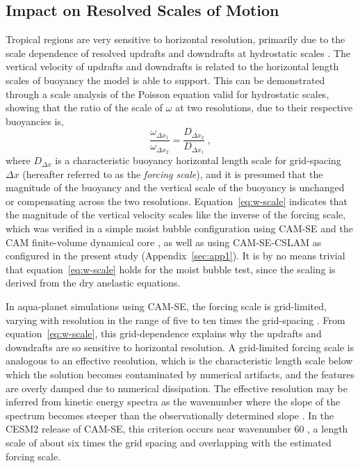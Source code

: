 \documentclass{agujournal}
\begin{document}
\subsection{Impact on Resolved Scales of Motion}\label{sec:aquaplanet}

Tropical regions are very sensitive to horizontal resolution, primarily due to the scale dependence of resolved updrafts and downdrafts at hydrostatic scales \citep{WETAL1997MWR,PG2006JAS,J2017JAMES,HR2017JCLIM,HR2018JAMES}. The vertical velocity of updrafts and downdrafts is related to the horizontal length scales of buoyancy the model is able to support. This can be demonstrated through a scale analysis of the Poisson equation \citep{JR2016QJRMS} valid for hydrostatic scales, showing that the ratio of the scale of $\omega$ at two resolutions, due to their respective buoyancies is,
\begin{equation}
\frac{\omega_{\Delta x_1}}{\omega_{\Delta x_2}} =  \frac{D_{\Delta x_2}}{D_{\Delta x_1}}~,\label{eq:w-scale}
\end{equation}
where $D_{\Delta x}$ is a characteristic buoyancy horizontal length scale for grid-spacing $\Delta x$ (hereafter referred to as the {\em{forcing scale}}), and it is presumed that the magnitude of the buoyancy and the vertical scale of the buoyancy is unchanged or compensating across the two resolutions. Equation~\eqref{eq:w-scale} indicates that the magnitude of the vertical velocity scales like the inverse of the forcing scale, which was verified in a simple moist bubble configuration using CAM-SE and the CAM finite-volume dynamical core \citep{HR2018JAMES}, as well as using CAM-SE-CSLAM as configured in the present study (Appendix~\ref{sec:app1}). It is by no means trivial that equation~\eqref{eq:w-scale} holds for the moist bubble test, since the scaling is derived from the dry anelastic equations.

In aqua-planet simulations using CAM-SE, the forcing scale is grid-limited, varying with resolution in the range of five to ten times the grid-spacing \citep{HR2018JAMES}. From equation~\eqref{eq:w-scale}, this grid-dependence explains why the updrafts and downdrafts are so sensitive to horizontal resolution. A grid-limited forcing scale is analogous to an effective resolution, which is the characteristic length scale below which the solution becomes contaminated by numerical artifacts, and the features are overly damped due to numerical dissipation. The effective resolution may be inferred from kinetic energy spectra as the wavenumber where the slope of the spectrum becomes steeper than the observationally determined slope \citep{S2011LNCSE}. In the CESM2 release of CAM-SE, this criterion occurs near wavenumber 60 \citep[see Figure 6 in][]{LetAl2018JAMES}, a length scale of about six times the grid spacing and overlapping with the estimated forcing scale.
\end{document}
